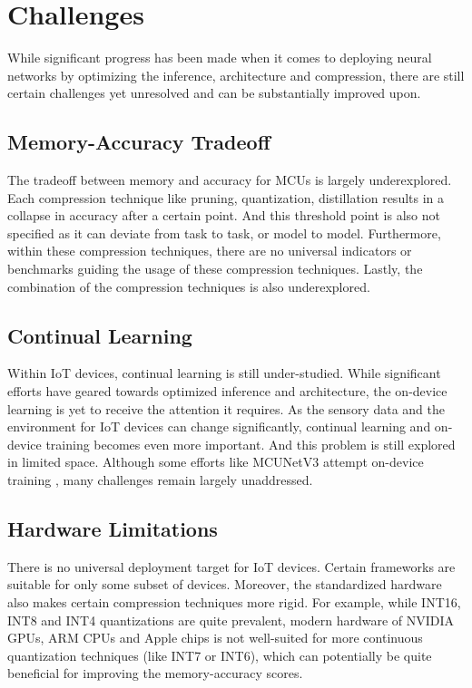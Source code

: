 \documentclass[conference]{IEEEtran}
\begin{document}
	\section{Challenges}
	
	While significant progress has been made when it comes to deploying neural networks by optimizing the inference, architecture and compression, there are still certain challenges yet unresolved and can be substantially improved upon.
	
	\subsection{Memory-Accuracy Tradeoff}
	The tradeoff between memory and accuracy for MCUs is largely underexplored. Each compression technique like pruning, quantization, distillation results in a collapse in accuracy after a certain point. And this threshold point is also not specified as it can deviate from task to task, or model to model. Furthermore, within these compression techniques, there are no universal indicators or benchmarks guiding the usage of these compression techniques. Lastly, the combination of the compression techniques is also underexplored.
	
	\subsection{Continual Learning}
	Within IoT devices, continual learning is still under-studied. While significant efforts have geared towards optimized inference and architecture, the on-device learning is yet to receive the attention it requires. As the sensory data and the environment for IoT devices can change significantly, continual learning and on-device training becomes even more important. And this problem is still explored in limited space. Although some efforts like MCUNetV3 attempt on-device training \cite{mcunetv32022}, many challenges remain largely unaddressed.
	
	\subsection{Hardware Limitations}
	There is no universal deployment target for IoT devices. Certain frameworks are suitable for only some subset of devices. Moreover, the standardized hardware also makes certain compression techniques more rigid. For example, while INT16, INT8 and INT4 quantizations are quite prevalent, modern hardware of NVIDIA GPUs, ARM CPUs and Apple chips is not well-suited for more continuous quantization techniques (like INT7 or INT6), which can potentially be quite beneficial for improving the memory-accuracy scores.
	
\end{document}
